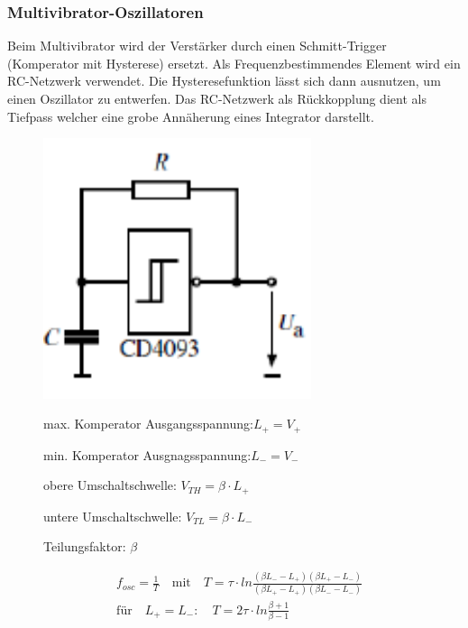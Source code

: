 \subsubsection{Multivibrator-Oszillatoren}
Beim Multivibrator wird der Verstärker durch einen Schmitt-Trigger (Komperator mit Hysterese) ersetzt. Als Frequenzbestimmendes Element wird ein RC-Netzwerk verwendet. Die Hysteresefunktion lässt sich dann ausnutzen, um einen Oszillator zu entwerfen. Das RC-Netzwerk als Rückkopplung dient als Tiefpass welcher eine grobe Annäherung eines Integrator darstellt.
\begin{figure}[h!]
	\begin{minipage}{0.3\textwidth} 
	\includegraphics[width=0.7\textwidth]{images/Multivibrator_Komp}
	\end{minipage}
	\begin{minipage}{0.6\textwidth}
      \begin{compactitem}
        \item max. Komperator Ausgangsspannung:\quad $L_+=V_+$
        \item min. Komperator Ausgnagsspannung:\quad $L_-=V_-$
        \item obere Umschaltschwelle: \quad $V_{TH}=\beta\cdot L_+$
        \item untere Umschaltschwelle: \quad $V_{TL}=\beta\cdot L_-$
        \item Teilungsfaktor: $\beta$\\
       \end{compactitem}
      \begin{equation*} 
        \begin{split} 
          &f_{osc}=\frac{1}{T} \quad \text{mit} \quad T=\tau \cdot ln \frac{(\beta L_- - L_+)(\beta L_+ - L_-)}{(\beta L_+ - L_+)(\beta L_- - L_-)}\\
          & \text{für} \quad   L_+=L_-: \quad  T=2\tau \cdot ln\frac{\beta+1}{\beta-1}\\
        \end{split} 
      \end{equation*}
	\end{minipage}
\end{figure}

